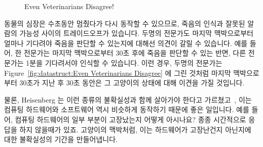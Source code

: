\begin{figure}[tb]
\centering
{}
\caption{Even Veterinarians Disagree!}
\end{figure}

동물의 심장은 수초동안 멈췄다가 다시 동작할 수 있으므로, 죽음의 인식과 잘못된
알람의 가능성 사이의 트레이드오프가 있습니다.
두명의 전문가도 마지막 맥박으로부터 얼마나 기다려야 죽음을 판단할 수 있는지에
대해선 의견이 갈릴 수 있습니다.
예를 들어, 한 전문가는 마지막 맥박으로부터 30초 후에 죽음을 판단할 수 있는
반면, 다른 전문가는 1분을 기다려서야 인식할 수 있습니다.
이런 경우, 두명의 전문가는
Figure~\ref{fig:datastruct:Even Veterinarians Disagree} 에 그린 것처럼 마지막
맥박으로부터 30초가 지난 후 30초 동안은 그 고양이의 상태에 대해 이견을 가질
것입니다.

물론, Heisenberg 는 이런 종류의 불확실성과 함께 살아가야 한다고
가르쳤고~\cite{WeinerHeisenberg1927Uncertain}, 이는 컴퓨팅 하드웨어와
소프트웨어 역시 비슷하게 동작하기 때문에 좋은 일입니다.
예를 들어, 컴퓨팅 하드웨어의 일부 부분이 고장났는지 어떻게 아시나요?
종종 시간적으로 응답을 하지 않을때가 있죠.
고양이의 맥박처럼, 이는 하드웨어가 고장난건지 아닌지에 대한 불확실성의 기간을
만들어냅니다.
\iffalse


